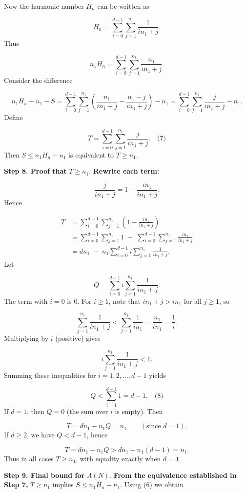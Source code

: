 \documentclass{llmxive}
\begin{document}
Now the harmonic number \(H_n\) can be written as\par
\[
H_n = \sum_{i=0}^{d-1}\sum_{j=1}^{n_1}\frac{1}{i n_1 + j}.
\]
Thus\par
\[
n_1 H_n = \sum_{i=0}^{d-1}\sum_{j=1}^{n_1}\frac{n_1}{i n_1 + j}.
\]
Consider the difference\par
\[
n_1 H_n - n_1 - S = \sum_{i=0}^{d-1}\sum_{j=1}^{n_1}\left(\frac{n_1}{i n_1 + j} - \frac{n_1 - j}{i n_1 + j}\right) - n_1 = \sum_{i=0}^{d-1}\sum_{j=1}^{n_1}\frac{j}{i n_1 + j} - n_1.
\]
Define\par
\[
T = \sum_{i=0}^{d-1}\sum_{j=1}^{n_1}\frac{j}{i n_1 + j}. \quad\text{(7)}
\]
Then \(S \le n_1 H_n - n_1\) is equivalent to \(T \ge n_1\).\par
\textbf{Step 8. Proof that }\(T \ge n_1\).\textbf{ Rewrite each term:}\par
\[
\frac{j}{i n_1 + j} = 1 - \frac{i n_1}{i n_1 + j}.
\]
Hence\par
\[
\begin{aligned}
T &= \sum_{i=0}^{d-1}\sum_{j=1}^{n_1} \left(1 - \frac{i n_1}{i n_1 + j}\right) \\
&= \sum_{i=0}^{d-1}\sum_{j=1}^{n_1} 1 \;-\; \sum_{i=0}^{d-1}\sum_{j=1}^{n_1} \frac{i n_1}{i n_1 + j} \\
&= d n_1 \;-\; n_1 \sum_{i=0}^{d-1} i \sum_{j=1}^{n_1}\frac{1}{i n_1 + j}.
\end{aligned}
\]
Let\par
\[
Q = \sum_{i=0}^{d-1} i \sum_{j=1}^{n_1}\frac{1}{i n_1 + j}.
\]
The term with \(i=0\) is \(0\). For \(i \ge 1\), note that \(i n_1 + j > i n_1\) for all \(j\ge 1\), so\par
\[
\sum_{j=1}^{n_1}\frac{1}{i n_1 + j} < \sum_{j=1}^{n_1}\frac{1}{i n_1} = \frac{n_1}{i n_1} = \frac1i.
\]
Multiplying by \(i\) (positive) gives\par
\[
i \sum_{j=1}^{n_1}\frac{1}{i n_1 + j} < 1.
\]
Summing these inequalities for \(i = 1,2,\dots,d-1\) yields\par
\[
Q < \sum_{i=1}^{d-1} 1 = d-1. \quad\text{(8)}
\]
If \(d = 1\), then \(Q = 0\) (the sum over \(i\) is empty). Then\par
\[
T = d n_1 - n_1 Q = n_1 \qquad (\text{since } d=1).
\]
If \(d \ge 2\), we have \(Q < d-1\), hence\par
\[
T = d n_1 - n_1 Q > d n_1 - n_1 (d-1) = n_1.
\]
Thus in all cases \(T \ge n_1\), with equality exactly when \(d = 1\).\par
\textbf{Step 9. Final bound for }\(A(N)\).\textbf{ From the equivalence established in Step 7, }\(T \ge n_1\) implies \(S \le n_1 H_n - n_1\). Using (6) we obtain\par
\end{document}
